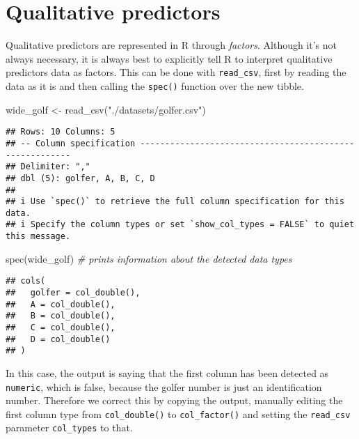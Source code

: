 \documentclass[
  oneside]{book}
\newenvironment{Shaded}{\begin{snugshade}}{\end{snugshade}}
\newcommand{\CommentTok}[1]{\textcolor[rgb]{0.56,0.35,0.01}{\textit{#1}}}
\newcommand{\FunctionTok}[1]{\textcolor[rgb]{0.00,0.00,0.00}{#1}}
\newcommand{\NormalTok}[1]{#1}
\newcommand{\OtherTok}[1]{\textcolor[rgb]{0.56,0.35,0.01}{#1}}
\newcommand{\StringTok}[1]{\textcolor[rgb]{0.31,0.60,0.02}{#1}}
\begin{document}
\hypertarget{qualitative-predictors}{%
\section{Qualitative predictors}\label{qualitative-predictors}}

Qualitative predictors are represented in R through \emph{factors}.
Although it's not always necessary, it is always best to
explicitly tell R to interpret qualitative predictors data as factors.
This can be done with \texttt{read\_csv}, first by reading the data as it is
and then calling the \texttt{spec()} function over the new tibble.

\begin{Shaded}
\begin{Highlighting}[]
\NormalTok{wide\_golf }\OtherTok{\textless{}{-}} \FunctionTok{read\_csv}\NormalTok{(}\StringTok{"./datasets/golfer.csv"}\NormalTok{)}
\end{Highlighting}
\end{Shaded}

\begin{verbatim}
## Rows: 10 Columns: 5
## -- Column specification --------------------------------------------------------
## Delimiter: ","
## dbl (5): golfer, A, B, C, D
## 
## i Use `spec()` to retrieve the full column specification for this data.
## i Specify the column types or set `show_col_types = FALSE` to quiet this message.
\end{verbatim}

\begin{Shaded}
\begin{Highlighting}[]
\FunctionTok{spec}\NormalTok{(wide\_golf) }\CommentTok{\# prints information about the detected data types}
\end{Highlighting}
\end{Shaded}

\begin{verbatim}
## cols(
##   golfer = col_double(),
##   A = col_double(),
##   B = col_double(),
##   C = col_double(),
##   D = col_double()
## )
\end{verbatim}

In this case, the output is saying that the first column has
been detected as \texttt{numeric}, which is false, because the golfer
number is just an identification number.
Therefore we correct this by copying the output, manually editing
the first column type from \texttt{col\_double()} to \texttt{col\_factor()} and
setting the \texttt{read\_csv} parameter \texttt{col\_types} to that.
\end{document}
